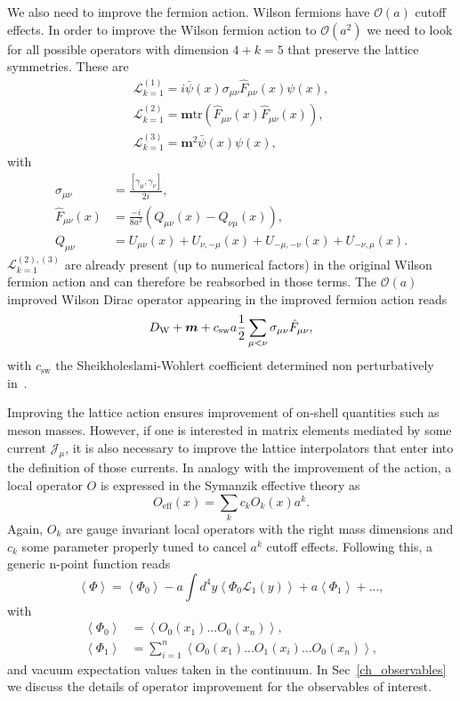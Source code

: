 We also need to improve the fermion action. Wilson fermions have $\mathcal{O}(a)$ cutoff effects. In order to improve the Wilson fermion action to $\mathcal{O}(a^2)$ we need to look for all possible operators with dimension $4+k=5$ that preserve the lattice symmetries. These are
\begin{gather}
\label{ch_foundation:eq:L1}
\mathcal{L}_{k=1}^{(1)}=i\bar{\psi}(x)\sigma_{\mu\nu}\hat{F}_{\mu\nu}(x)\psi(x),\\
\mathcal{L}_{k=1}^{(2)}=\boldsymbol{m}{\textrm{tr}}\left(\hat{F}_{\mu\nu}(x)\hat{F}_{\mu\nu}(x)\right),\\
\mathcal{L}_{k=1}^{(3)}=\boldsymbol{m}^2\bar{\psi}(x)\psi(x),
\end{gather}
with
\begin{align}
\label{ch_foundation:eq:dim5-op}
\sigma_{\mu\nu}&=\frac{\left[\gamma_{\mu},\gamma_{\nu}\right]}{2i},\\
\hat{F}_{\mu\nu}(x)&=\frac{-i}{8a^2}\left(Q_{\mu\nu}(x)-Q_{\nu\mu}(x)\right),\\
Q_{\mu\nu}&=U_{\mu\nu}(x)+U_{\nu,-\mu}(x)+U_{-\mu,-\nu}(x)+U_{-\nu,\mu}(x).
\end{align}
$\mathcal{L}_{k=1}^{(2),(3)}$ are already present (up to numerical factors) in the original Wilson fermion action and can therefore be reabsorbed in those terms. The $\mathcal{O}(a)$ improved Wilson Dirac operator appearing in the improved fermion action reads
\begin{equation}
\label{ch_foundation:eq:DW_impr}
D_{\textrm W}+\boldsymbol{m}+c_{\textrm{sw}}a\frac{1}{2}\sum_{\mu<\nu}\sigma_{\mu\nu}\hat{F}_{\mu\nu},
\end{equation}
with $c_{\textrm{sw}}$ the Sheikholeslami-Wohlert coefficient determined non perturbatively in~\citep{Sheikholeslami:1985ij}.

Improving the lattice action ensures improvement of on-shell quantities such as meson masses. However, if one is interested in matrix elements mediated by some current $\mathcal{J}_{\mu}$, it is also necessary to improve the lattice interpolators that enter into the definition of those currents. In analogy with the improvement of the action, a local operator $O$ is expressed in the Symanzik effective theory as
\begin{equation}
O_{\textrm{eff}}(x)=\sum_kc_kO_k(x)a^k.
\end{equation}
Again, $O_k$ are gauge invariant local operators with the right mass dimensions and $c_k$ some parameter properly tuned to cancel $a^k$ cutoff effects. Following this, a generic n-point function reads
\begin{equation}
\label{ch_foundation:eq:Oimpr}
\left<\Phi\right>=\left<\Phi_0\right>-a\int d^4y\left<\Phi_0\mathcal{L}_1(y)\right>+a\left<\Phi_1\right>+...,
\end{equation}
with 
\begin{align}
\left<\Phi_0\right>&=\left<O_0(x_1)...O_0(x_n)\right>, \\
\left<\Phi_1\right>&=\sum_{i=1}^n\left<O_0(x_1)...O_1(x_i)...O_0(x_n)\right>,
\end{align}
and vacuum expectation values taken in the continuum. In Sec~\ref{ch_observables} we discuss the details of operator improvement for the observables of interest.

